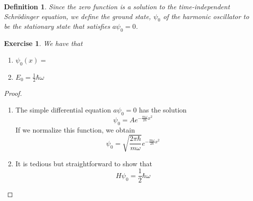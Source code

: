 \documentclass[12pt]{amsart}
\newtheorem{defn}[thm]{Definition}
\newtheorem{ex}[thm]{Exercise}
\newcommand{\sch}{Schr\"{o}dinger }
\newcommand{\om}{\omega}
\begin{document}
\begin{defn}
Since the zero function is a solution to the time-independent \sch equation, we define the ground state, $\psi_0$ of the harmonic oscillator to be the stationary state that satisfies $a\psi_0 = 0$. 
\end{defn}

\begin{ex}
We have that
\begin{enumerate}
\item $\psi_0(x) = $
\item $E_0 = \frac{1}{2}\hbar \om$
\end{enumerate}

\end{ex}

\begin{proof}\
\begin{enumerate}
\item The simple differential equation $a\psi_0 = 0$ has the solution $$\psi_0 = Ae^{-\frac{m \om}{2 \hbar}x^2}$$ If we normalize this function, we obtain $$\psi_0= \sqrt{\frac{2 \pi \hbar}{m \om}}e^{-\frac{m \om}{2 \hbar}x^2}$$
\item It is tedious but straightforward to show that $$H\psi_0 = \frac{1}{2}\hbar \om$$
\end{enumerate} 
\end{proof}
\end{document}
